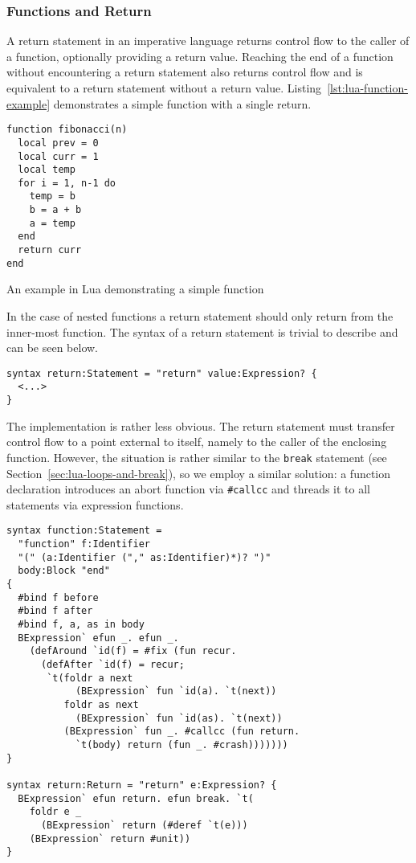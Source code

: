 \documentclass{kththesis}
\begin{document}

\subsubsection{Functions and Return}

A return statement in an imperative language returns control flow to the caller of a function, optionally providing a return value. Reaching the end of a function without encountering a return statement also returns control flow and is equivalent to a return statement without a return value. Listing~\ref{lst:lua-function-example} demonstrates a simple function with a single return.

\begin{listing}
\begin{verbatim}
function fibonacci(n)
  local prev = 0
  local curr = 1
  local temp
  for i = 1, n-1 do
    temp = b
    b = a + b
    a = temp
  end
  return curr
end
\end{verbatim}
\caption{An example in Lua demonstrating a simple function}
\label{lst:lua-function-example}
\end{listing}

In the case of nested functions a return statement should only return from the inner-most function. The syntax of a return statement is trivial to describe and can be seen below.

\begin{verbatim}
syntax return:Statement = "return" value:Expression? {
  <...>
}
\end{verbatim}

The implementation is rather less obvious. The return statement must transfer control flow to a point external to itself, namely to the caller of the enclosing function. However, the situation is rather similar to the \texttt{break} statement (see Section~\ref{sec:lua-loops-and-break}), so we employ a similar solution: a function declaration introduces an abort function via \texttt{#callcc} and threads it to all statements via expression functions.

\begin{verbatim}
syntax function:Statement =
  "function" f:Identifier
  "(" (a:Identifier ("," as:Identifier)*)? ")"
  body:Block "end"
{
  #bind f before
  #bind f after
  #bind f, a, as in body
  BExpression` efun _. efun _.
    (defAround `id(f) = #fix (fun recur.
      (defAfter `id(f) = recur;
       `t(foldr a next
            (BExpression` fun `id(a). `t(next))
          foldr as next
            (BExpression` fun `id(as). `t(next))
          (BExpression` fun _. #callcc (fun return.
            `t(body) return (fun _. #crash)))))))
}

syntax return:Return = "return" e:Expression? {
  BExpression` efun return. efun break. `t(
    foldr e _
      (BExpression` return (#deref `t(e)))
    (BExpression` return #unit))
}
\end{verbatim}
\end{document}
